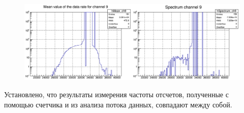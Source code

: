

\begin{figure}
\includegraphics[width=1.0\textwidth]{pictures/TDCscalerScan.png}
\caption{}
\label{fig:TDCscalerScan}
\end{figure}

Установлено, что результаты измерения частоты отсчетов, полученные с помощью счетчика и из анализа потока данных, совпадают между собой.

